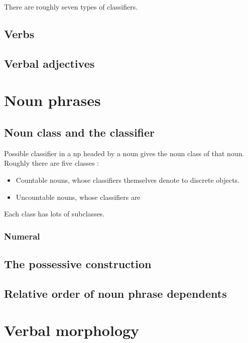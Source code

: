 \documentclass[UTF8, a4paper, oneside, scheme=plain]{ctexart}
\newcommand*{\citesec}[1]{\S~{#1}}
\begin{document}
There are roughly seven types of classifiers. %

\subsection{Verbs}

\subsection{Verbal adjectives}


\section{Noun phrases}

\subsection{Noun class and the classifier}\label{sec:noun-class-classifier}

Possible classifier in a \ac{np} headed by a noun 
gives the noun class of that noun.
Roughly there are five classes \citep[\citesec{4.1.2}]{zhudexigrammar}:
\begin{itemize} %
    \item Countable nouns, whose classifiers themselves denote to discrete objects.
    \item Uncountable nouns, whose classifiers are 
\end{itemize}
Each class has lots of subclasses.

\subsubsection{Numeral}\label{sec:numeral-classifier}

\subsection{The possessive construction}\label{sec:possession}


\subsection{Relative order of noun phrase dependents}

\section{Verbal morphology}
\end{document}
